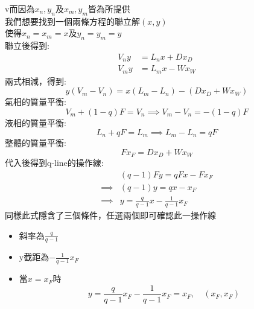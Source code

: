 \documentclass[../main.tex]{subfiles}
\begin{document}
\begin{itemize}
\begin{itemize}
\begin{equation}
    \end{equation}
    v而因為$x_n,y_n$及$x_m,y_m$皆為所提供\\
    我們想要找到一個兩條方程的聯立解$(x,y)$\\
    使得$x_n = x_m = x$及$y_n = y_m = y$\\
    聯立後得到:
    \begin{align}
      V_n y &= L_n x + D x_D \\
      V_m y &= L_m x - W x_W
    \end{align}
    兩式相減，得到:
    \begin{equation}
      y(V_m - V_n) = x(L_m - L_n) - (D x_D + W x_W)
    \end{equation}
    氣相的質量平衡:
    \begin{equation}
      V_m + (1-q)F = V_n \implies V_m - V_n = - (1-q)F
    \end{equation}
    液相的質量平衡:
    \begin{equation}
      L_n + qF = L_m \implies L_m - L_n = qF
    \end{equation}
    整體的質量平衡:
    \begin{equation}
      Fx_F = D x_D + W x_W
    \end{equation}
    代入後得到q-line的操作線:
    \begin{align}
      & (q-1)Fy = qFx - Fx_F \nonumber\\
      \implies & (q-1)y = qx - x_F \nonumber\\
      \implies & \boxed{y = \frac{q}{q-1}x - \frac{1}{q-1}x_F}
    \end{align}
    同樣此式隱含了三個條件，任選兩個即可確認此一操作線
    \begin{itemize}
      \item 斜率為$\frac{q}{q-1}$
      \item y截距為$-\frac{1}{q-1}x_F$
      \item 當$x= x_F$時
      \begin{equation}
        y = \frac{q}{q-1}x_F - \frac{1}{q-1}x_F = x_F, \quad (x_F, x_F)
      \end{equation}
    \end{itemize}
    \begin{figure}[H]
      \centering
\end{figure}
\end{itemize}
\end{itemize}
\end{document}
